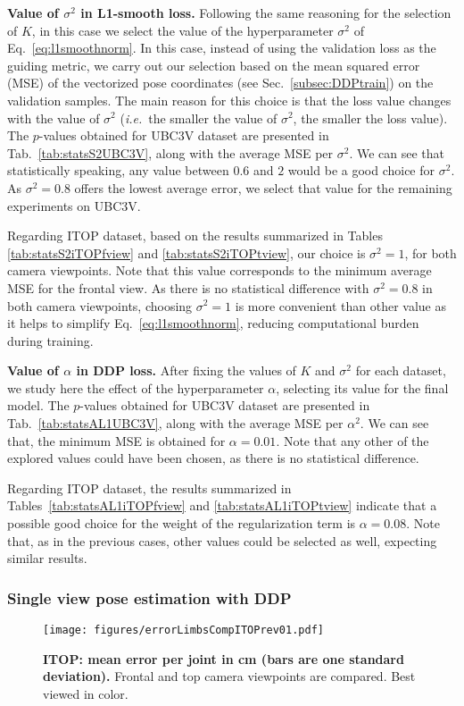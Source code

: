 \documentclass[review,12pt,3p]{elsarticle}
\def \ie{\textit{i.e.}}
\newcommand{\myparagraph}[1]{\noindent \textbf{#1}}
\begin{document}
\myparagraph{Value of $\sigma^2$ in L1-smooth loss.}
Following the same reasoning for the selection of $K$, in this case we select the value of the hyperparameter $\sigma^2$ of Eq.~\ref{eq:l1smoothnorm}. 
In this case, instead of using the validation loss as the guiding metric, we carry out our selection based on the mean squared error (MSE) of the vectorized pose coordinates (see Sec.~\ref{subsec:DDPtrain}) on the validation samples. The main reason for this choice is that the loss value changes with the value of $\sigma^2$ (\ie~the smaller the value of $\sigma^2$, the smaller the loss value).
The $p$-values obtained for UBC3V dataset are presented in Tab.~\ref{tab:statsS2UBC3V}, along with the average MSE per $\sigma^2$. We can see that statistically speaking, any value between $0.6$ and $2$ would be a good choice for $\sigma^2$. As $\sigma^2=0.8$ offers the lowest average error, we select that value for the remaining experiments on UBC3V.


Regarding ITOP dataset, based on the results summarized in Tables \ref{tab:statsS2iTOPfview} and \ref{tab:statsS2iTOPtview}, our choice is $\sigma^2=1$, for both camera viewpoints. Note that this value corresponds to the minimum average MSE for the frontal view. As there is no statistical difference with $\sigma^2=0.8$ in both camera viewpoints, choosing $\sigma^2=1$ is more convenient than other value as it helps to simplify Eq.~\ref{eq:l1smoothnorm}, reducing computational burden during training.


\myparagraph{Value of $\alpha$ in DDP loss.}
After fixing the values of $K$ and $\sigma^2$ for each dataset, we study here the effect of the hyperparameter $\alpha$, selecting its value for the final model.
The $p$-values obtained for UBC3V dataset are presented in Tab.~\ref{tab:statsAL1UBC3V}, along with the average MSE per $\alpha^2$. We can see that, the minimum MSE is obtained for $\alpha=0.01$. Note that any other of the explored values could have been chosen, as there is no statistical difference.

Regarding ITOP dataset, the results summarized in Tables~\ref{tab:statsAL1iTOPfview} and \ref{tab:statsAL1iTOPtview} indicate that a possible good choice for the weight of the regularization term is $\alpha = 0.08$. Note that, as in the previous cases, other values could be selected as well, expecting similar results.

\subsubsection{Single view pose estimation with DDP}
\begin{figure}[tb]
\centering
   \texttt{[image: figures/errorLimbsCompITOPrev01.pdf]}
   \caption{\textbf{ITOP: mean error per joint in cm (bars are one standard deviation).} Frontal and top camera viewpoints are compared. Best viewed in color.}
   \label{fig:jointsErrorCNNitop}
\end{figure}
\end{document}
